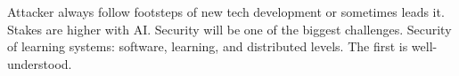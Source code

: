 Attacker always follow footsteps of new tech development or sometimes leads it. Stakes are higher with AI. Security will be one of the biggest challenges.
%
%
%
%
%
%
%
%
%
%
Security of learning systems: software, learning, and distributed levels. The first is well-understood.

